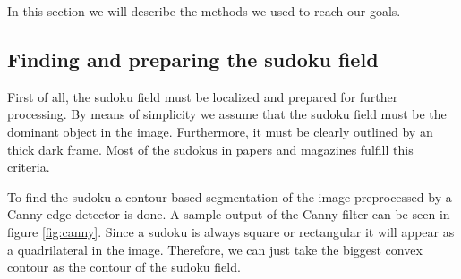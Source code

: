 \documentclass[
a4paper,     %
12pt         %
]{scrartcl}  %
\begin{document}
In this section we will describe the methods we used to reach our goals.

\subsection{Finding and preparing the sudoku field}
\label{sec:find}

First of all, the sudoku field must be localized and prepared for further
processing. By means of simplicity we assume that the sudoku field must be
the dominant object in the image. Furthermore, it must be clearly outlined by
an thick dark frame. Most of the sudokus in papers and magazines fulfill this
criteria.

To find the sudoku a contour based segmentation of the image preprocessed by
a Canny edge detector is done. A sample output of the Canny filter can be seen
in figure \ref{fig:canny}. Since a sudoku is always square or rectangular
it will appear as a quadrilateral in the image. Therefore, we can just take 
the biggest convex contour as the contour of the sudoku field.
\end{document}
